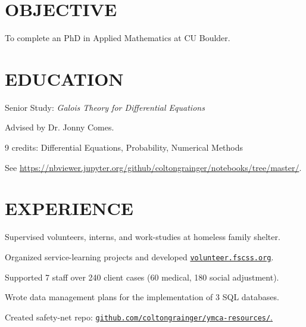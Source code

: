 \documentclass[margin]{res}
\begin{document}
\begin{resume}

\printheader

\section{OBJECTIVE}

To complete an PhD in Applied Mathematics at CU Boulder.

\section{EDUCATION}

    \begin{details}
        \item Senior Study: \emph{Galois Theory for Differential Equations}
        \item Advised by Dr. Jonny Comes.
    \end{details}

    \begin{details}
        \item 9 credits: Differential Equations, Probability, Numerical Methods 
        \item See \href{my Jupyter notebooks}{https://nbviewer.jupyter.org/github/coltongrainger/notebooks/tree/master/}. 
    \end{details}

\section{EXPERIENCE}

    \begin{details}
        \item{Supervised volunteers, interns, and work-studies at homeless family shelter.}
        \item{Organized service-learning projects and developed \href{http://volunteer.fscss.org}{\texttt{volunteer.fscss.org}}.}
    \end{details}

    \begin{details}
        \item{Supported 7 staff over 240 client cases (60 medical, 180 social adjustment).}
        \item{Wrote data management plans for the implementation of 3 SQL databases.}
        \item{Created safety-net repo: \href{https://github.com/coltongrainger/ymca-resources/}{\texttt{github.com/coltongrainger/ymca-resources/}.}}
    \end{details}


\end{resume}
\end{document}
